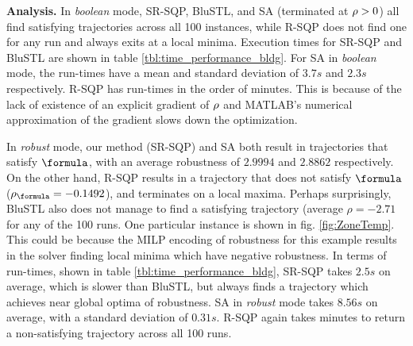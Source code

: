 \textbf{Analysis.} In \textit{boolean} mode, SR-SQP, BluSTL, and SA (terminated at $\rho>0$) all find satisfying trajectories across all 100 instances, while R-SQP does not find one for any run and always exits at a local minima. Execution times for SR-SQP and BluSTL are shown in table \ref{tbl:time_performance_bldg}. For SA in \textit{boolean} mode, the run-times have a mean and standard deviation of $3.7s$ and $2.3s$ respectively. R-SQP has run-times in the order of minutes. This is because of the lack of existence of an explicit gradient of $\rho$ and MATLAB's numerical approximation of the gradient slows down the optimization.


In \textit{robust} mode, our method (SR-SQP) and SA both result in trajectories that satisfy $\formula$, with an average robustness of $2.9994$ and $2.8862$ respectively. On the other hand, R-SQP results in a trajectory that does not satisfy $\formula$ ($\rob_{\formula} = -0.1492$), and terminates on a local maxima. Perhaps surprisingly, BluSTL also does not manage to find a satisfying trajectory (average $\rho=-2.71$ for any of the 100 runs. One particular instance is shown in fig. \ref{fig:ZoneTemp}. This could be because the MILP encoding of robustness for this example results in the solver finding local minima which have negative robustness. In terms of run-times, shown in table \ref{tbl:time_performance_bldg}, SR-SQP takes $2.5s$ on average, which is slower than BluSTL, but always finds a trajectory which achieves near global optima of robustness. SA in \textit{robust} mode takes $8.56s$ on average, with a standard deviation of $0.31s$. R-SQP again takes minutes to return a non-satisfying trajectory across all 100 runs. 



